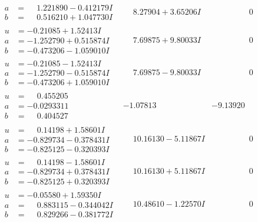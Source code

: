 \documentclass[1p]{elsarticle_modified}
\theoremstyle{definition}
\begin{document}
$$\begin{array}{c|c|c}
\begin{aligned}
a &= \phantom{-}1.221890 - 0.412179 I \\
b &= \phantom{-}0.516210 + 1.047730 I\end{aligned}
 & \phantom{-}8.27904 + 3.65206 I & \phantom{-0.000000 } 0 \\ \hline\begin{aligned}
u &= -0.21085 + 1.52413 I \\
a &= -1.252790 + 0.515874 I \\
b &= -0.473206 - 1.059010 I\end{aligned}
 & \phantom{-}7.69875 + 9.80033 I & \phantom{-0.000000 } 0 \\ \hline\begin{aligned}
u &= -0.21085 - 1.52413 I \\
a &= -1.252790 - 0.515874 I \\
b &= -0.473206 + 1.059010 I\end{aligned}
 & \phantom{-}7.69875 - 9.80033 I & \phantom{-0.000000 } 0 \\ \hline\begin{aligned}
u &= \phantom{-}0.455205\phantom{ +0.000000I} \\
a &= -0.0293311\phantom{ +0.000000I} \\
b &= \phantom{-}0.404527\phantom{ +0.000000I}\end{aligned}
 & -1.07813\phantom{ +0.000000I} & -9.13920\phantom{ +0.000000I} \\ \hline\begin{aligned}
u &= \phantom{-}0.14198 + 1.58601 I \\
a &= -0.829734 - 0.378431 I \\
b &= -0.825125 - 0.320393 I\end{aligned}
 & \phantom{-}10.16130 - 5.11867 I & \phantom{-0.000000 } 0 \\ \hline\begin{aligned}
u &= \phantom{-}0.14198 - 1.58601 I \\
a &= -0.829734 + 0.378431 I \\
b &= -0.825125 + 0.320393 I\end{aligned}
 & \phantom{-}10.16130 + 5.11867 I & \phantom{-0.000000 } 0 \\ \hline\begin{aligned}
u &= -0.05580 + 1.59350 I \\
a &= \phantom{-}0.883115 - 0.344042 I \\
b &= \phantom{-}0.829266 - 0.381772 I\end{aligned}
 & \phantom{-}10.48610 - 1.22570 I & \phantom{-0.000000 } 0\\

\end{array}$$
\end{document}
